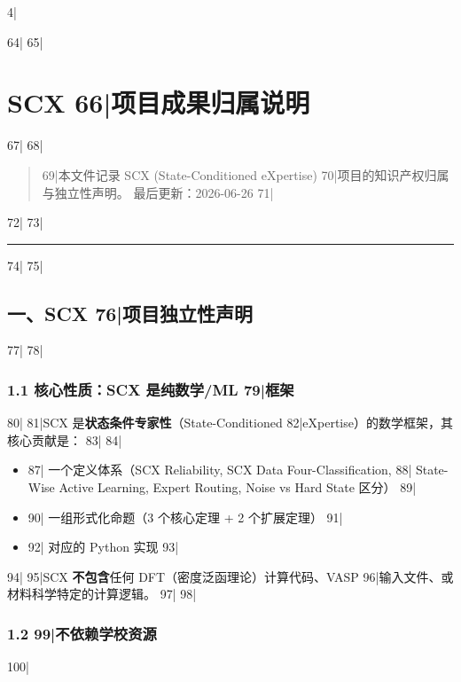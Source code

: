 4|\documentclass[
5|  12pt,
6|]{ctexart}
\begin{document}
64|
65|\section{SCX
66|项目成果归属说明}\label{scx-ux9879ux76eeux6210ux679cux5f52ux5c5eux8bf4ux660e}
67|
68|\begin{quote}
69|本文件记录 SCX (State-Conditioned eXpertise)
70|项目的知识产权归属与独立性声明。 最后更新：2026-06-26
71|\end{quote}
72|
73|\begin{center}\rule{0.5\linewidth}{0.5pt}\end{center}
74|
75|\subsection{一、SCX
76|项目独立性声明}\label{ux4e00scx-ux9879ux76eeux72ecux7acbux6027ux58f0ux660e}
77|
78|\subsubsection{1.1 核心性质：SCX 是纯数学/ML
79|框架}\label{ux6838ux5fc3ux6027ux8d28scx-ux662fux7eafux6570ux5b66ml-ux6846ux67b6}
80|
81|SCX 是\textbf{状态条件专家性}（State-Conditioned
82|eXpertise）的数学框架，其核心贡献是：
83|
84|\begin{itemize}
85||\item
87|  一个定义体系（SCX Reliability, SCX Data Four-Classification,
88|  State-Wise Active Learning, Expert Routing, Noise vs Hard State 区分）
89|\item
90|  一组形式化命题（3 个核心定理 + 2 个扩展定理）
91|\item
92|  对应的 Python 实现
93|\end{itemize}
94|
95|SCX \textbf{不包含}任何 DFT（密度泛函理论）计算代码、VASP
96|输入文件、或材料科学特定的计算逻辑。
97|
98|\subsubsection{1.2
99|不依赖学校资源}\label{ux4e0dux4f9dux8d56ux5b66ux6821ux8d44ux6e90}
100|
\end{document}
